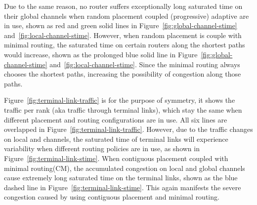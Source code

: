 Due to the same reason, 
no router suffers exceptionally long saturated time on their global channels when random placement coupled (progressive) adaptive are in use, 
shown as red and green solid lines in Figure~\ref{fig:global-channel-stime} and~\ref{fig:local-channel-stime}. 
However, when random placement is couple with minimal routing, 
the saturated time on certain routers along the shortest paths would increase, 
shown as the prolonged blue solid line in Figure~\ref{fig:global-channel-stime} and~\ref{fig:local-channel-stime}. 
Since the minimal routing always chooses the shortest paths, 
increasing the possibility of congestion along those paths. 


Figure~\ref{fig:terminal-link-traffic} is for the purpose of symmetry, 
it shows the traffic per rank (aka traffic through terminal links), 
which stay the same when different placement and routing configurations are in use. 
All six lines are overlapped in Figure~\ref{fig:terminal-link-traffic}. 
However, due to the traffic changes on local and channels, 
the saturated time of terminal links will experience variability when different routing policies are in use, as shown in Figure~\ref{fig:terminal-link-stime}. 
When contiguous placement coupled with minimal routing(CM), 
the accumulated congestion on local and global channels cause extremely long saturated time on the terminal links, 
shown as the blue dashed line in Figure~\ref{fig:terminal-link-stime}. 
This again manifests the severe congestion caused by using contiguous placement and minimal routing. 


